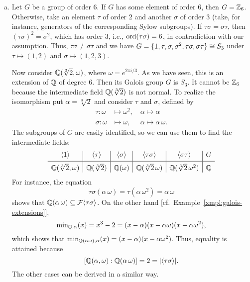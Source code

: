\begin{xmpls}\label{xmpls:galois-thm}${}$
    \begin{enumerate}[a), font=\upshape]
        \item Let $G$ be a group of order $6$. If $G$ has some element of order $6$, then $G=\mathbb{Z}_6$. Otherwise, take an element $\tau$ of order $2$ and another $\sigma$ of order $3$ (take, for instance, generators of the corresponding Sylow subgroups). If $\tau\sigma=\sigma\tau$, then $(\tau\sigma)^2=\sigma^2$, which has order $3$, i.e., ${\rm ord}(\tau\sigma)=6$, in contradiction with our assumption. Thus, $\tau\sigma\ne \sigma\tau$ and we have $G=\{1, \tau, \sigma, \sigma^2, \tau\sigma, \sigma\tau\}\cong S_3$ under $\tau\mapsto (1,2)$ and $\sigma\mapsto(1,2,3)$.

        Now consider $\mathbb{Q}(\sqrt[3]2,\omega)$, where $\omega=e^{2\pi i/3}$. As we have seen, this is an extension of $\mathbb{Q}$ of degree $6$. Then its Galois group $G$ is $S_3$. It cannot be $\mathbb{Z}_6$ because the intermediate field $\mathbb{Q}(\sqrt[3]2)$ is not normal. To realize the isomorphism put $\alpha=\sqrt[3]2$ and consider $\tau$ and $\sigma$, defined by
        \begin{align*}
            \tau\colon\omega&\mapsto\omega^2,
                \quad\alpha\mapsto\alpha\\
            \sigma\colon\omega&\mapsto\omega,\phantom{{}^2}
                \quad\alpha\mapsto\alpha\,\omega.
        \end{align*}
        The subgroups of $G$ are easily identified, so we can use them to find the intermediate fields:
        \small
        $$
            \begin{array}{c|c|c|c|c|c}
            \vphantom{\langle_{|_{|_|}}}\langle 1 \rangle
                & \langle \tau \rangle
                & \langle \sigma \rangle
                & \langle \tau\sigma \rangle
                & \langle \sigma\tau \rangle
                & G \\
            \hline
            \vphantom{|^{|^{|^|}}}\Q(\sqrt[3]{2}, \omega)
                & \Q(\sqrt[3]{2})
                & \Q(\omega)
                & \Q(\sqrt[3]{2}\,\omega)
                & \Q(\sqrt[3]{2}\,\omega^2)
                & \Q
            \end{array}
        $$
        \normalsize
        For instance, the equation
        $$
            \tau\sigma(\alpha\,\omega)
                = \tau(\alpha\,\omega^2)
                = \alpha\,\omega
        $$
        shows that $\mathbb{Q}(\alpha\,\omega)\subseteq\mathcal F\langle\tau\sigma\rangle$. On the other hand [cf.~Example~\ref{xmpl:galois-extensions}],
        $$
            \operatorname{min}_{\mathbb{Q},\alpha}(x)=x^3-2=(x-\alpha)(x-\alpha\omega)(x-\alpha\omega^2),
        $$
        which shows that $\operatorname{min}_{\mathbb{Q}(\alpha\omega),\alpha}(x)=(x-\alpha)(x-\alpha\omega^2)$. Thus, equality is attained because
        $$
            [\mathbb{Q}(\alpha,\omega):\mathbb{Q}(\alpha\,\omega)]
            = 2 = |\langle\tau\sigma\rangle|.
        $$
        The other cases can be derived in a similar way.


\end{enumerate}
\end{xmpls}
